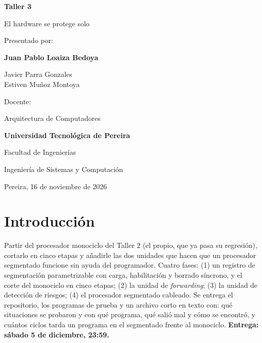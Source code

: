 \documentclass[11pt,letterpaper]{article}
\newcommand{\universidad}{Universidad Tecnol\'ogica de Pereira}
\newcommand{\facultad}{Facultad de Ingenier\'ias}
\newcommand{\materia}{Arquitectura de Computadores}
\newcommand{\estudiante}{Juan Pablo Loaiza Bedoya}
\newcommand*{\companeros}{Javier Parra Gonzales \\ Estiven Mu\~noz Montoya}
\newcommand*{\docente}{}
\newcommand{\fecha}{16 de noviembre de 2026}
\newcommand{\numtaller}{3}
\newcommand{\titulotaller}{El hardware se protege solo}
\begin{document}
\begin{titlepage}
  \centering
  \vspace*{2.0cm}
  {\Huge\bfseries Taller \numtaller\par}
  \vspace{0.5cm}
  {\LARGE \titulotaller\par}
  \vfill
  {\large Presentado por:\par}
  \vspace{0.2cm}
  {\large\bfseries \estudiante\par}
  \ifx\companeros\empty\else
    \vspace{0.2cm}{\large\bfseries \companeros\par}
  \fi
  \ifx\docente\empty\else
    \vspace{0.8cm}
    {\large Docente:\par}\vspace{0.2cm}{\large \docente\par}
  \fi
  \vspace{2.0cm}
  {\large \materia\par}
  \vspace{0.3cm}
  {\Large\bfseries \universidad\par}
  \vspace{0.2cm}
  {\large \facultad\par}
  \vspace{0.2cm}
  {\large Ingenier\'ia de Sistemas y Computaci\'on\par}
  \vspace{0.8cm}
  {\large Pereira, \fecha\par}
\end{titlepage}

\tableofcontents
\newpage

\section{Introducci\'on}
\begin{enunciado}
Partir del procesador monociclo del Taller 2 (el propio, que ya pasa su regresi\'on), cortarlo en cinco
etapas y a\~nadirle las dos unidades que hacen que un procesador segmentado funcione sin ayuda del
programador. Cuatro fases: (1) un registro de segmentaci\'on parametrizable con carga, habilitaci\'on y
borrado s\'incrono, y el corte del monociclo en cinco etapas; (2) la unidad de \emph{forwarding};
(3) la unidad de detecci\'on de riesgos; (4) el procesador segmentado cableado. Se entrega el
repositorio, los programas de prueba y un archivo corto en texto con: qu\'e situaciones se probaron y con
qu\'e programa, qu\'e sali\'o mal y c\'omo se encontr\'o, y cu\'antos ciclos tarda un programa en el
segmentado frente al monociclo. \textbf{Entrega: s\'abado 5 de diciembre, 23:59.}
\end{enunciado}
\end{document}
